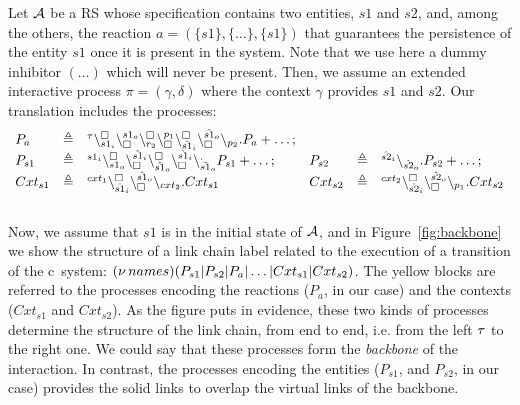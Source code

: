  
\begin{example}\label{ex:backbone}
Let ${\cal A}$ be a RS whose specification contains two entities, $s1$ and $s2$, and, among the others, the reaction $a=(\{s1\},\{\dots\} , \{s1\})$ that guarantees the persistence of the entity $s1$ once it is present in the system. Note that we use here a dummy inhibitor $(\dots)$ which will never be present. Then, we assume an  extended interactive process $\pi=(\gamma,\delta)$ where the context $\gamma$ provides  $s1$ and $s2$.
 Our translation includes the processes:
 \[
 \begin{array}{lcllcl}
 P_a &\triangleq& {}^{\tau}\backslash_{s1_i}^{\scriptstyle {\square}}\backslash_{\scriptstyle {\square}}^{s1_o}\backslash_{r_2}^{\scriptstyle {\square}} \backslash_{\scriptstyle {\square}}^{p_1}\backslash_{\tilde{s1}_i}^{\scriptstyle {\square}}\backslash_{\scriptstyle {\square}}^{\tilde{s1}_o}\backslash_{p_2}.P_a + \dots; \\
 P_{s1} &\triangleq& {}^{s1_i}\backslash_{s1_o}^{\scriptstyle {\square}}\backslash_{\scriptstyle {\square}}^{\hat{s1}_i}\backslash_{\hat{s1}_o}^{\scriptstyle {\square}}\backslash_{\scriptstyle {\square}}^{\tilde{s1}_i}\backslash_{\tilde{s1}_o}^{.}P_{s1} + \dots; &
  P_{s2} &\triangleq& {}^{\hat{s2}_i} \backslash_{\hat{s2}_o}.P_{s2} + \dots;\\
 Cxt_{s1}& \triangleq & {}^{cxt_1}\backslash_{\hat{s1}_i}^{\scriptstyle {\square}}\backslash_{\scriptstyle {\square}}^{\hat{s1}_o}\backslash_{cxt_2}.Cxt_{s1} &
  Cxt _{s2} &\triangleq& {}^{cxt_2}\backslash_{\hat{s2}_i}^{\scriptstyle {\square}}\backslash_{\scriptstyle {\square}}^{\hat{s2}_o}\backslash_{p_1}. Cxt_{s2}
\end{array}
\]  \\
   Now, we assume that $s1$ is in the initial state of ${\cal A}$, and in Figure~\ref{fig:backbone} we show the  structure of a link chain label related to the execution of a transition of the c\CNA \ system: $(\nu\, names) (P_{s1}|P_{s2}| P_a|\dots|Cxt_{s1}|Cxt_{s2})$. The yellow blocks are referred to the processes encoding the reactions ($P_a$, in our case) and the contexts ($Cxt_{s1}$ and $Cxt_{s2}$). As the figure puts in evidence, these two kinds of processes determine the structure of the link chain, from end to end, i.e. from the left $\tau$ to the right one. We could say that these processes form the \emph{backbone} of the interaction.
   In contrast, the processes encoding the entities ($P_{s1}$, and $P_{s2}$, in our case) provides the
    solid links to overlap the virtual links   of the backbone.
 
  \begin{figure}[t]
\end{figure}
\end{example}
